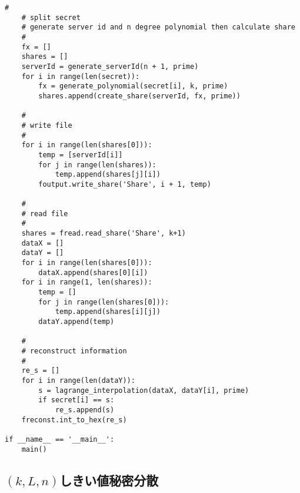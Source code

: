 \documentclass[10pt, a4paper, titlepage]{jsreport}
\begin{document}
\begin{lstlisting}[caption=ShamirSecretSharing.py, label=SSS]
    #
    # split secret
    # generate server id and n degree polynomial then calculate share
    #
    fx = []
    shares = []
    serverId = generate_serverId(n + 1, prime)
    for i in range(len(secret)):
        fx = generate_polynomial(secret[i], k, prime)
        shares.append(create_share(serverId, fx, prime))

    #
    # write file
    #
    for i in range(len(shares[0])):
        temp = [serverId[i]]
        for j in range(len(shares)):
            temp.append(shares[j][i])
        foutput.write_share('Share', i + 1, temp)
    
    #
    # read file
    #
    shares = fread.read_share('Share', k+1)
    dataX = []
    dataY = []
    for i in range(len(shares[0])):
        dataX.append(shares[0][i])
    for i in range(1, len(shares)):
        temp = []
        for j in range(len(shares[0])):
            temp.append(shares[i][j])
        dataY.append(temp)

    #
    # reconstruct information
    #
    re_s = []
    for i in range(len(dataY)):
        s = lagrange_interpolation(dataX, dataY[i], prime)
        if secret[i] == s:
            re_s.append(s)
    freconst.int_to_hex(re_s)

if __name__ == '__main__':
    main()
	\end{lstlisting}

	\subsection{$(k,L,n)$しきい値秘密分散}
\end{document}
